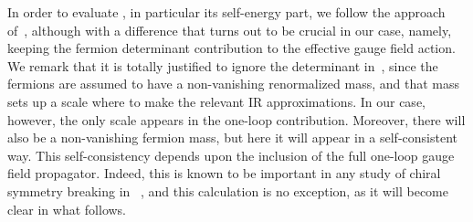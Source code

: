 \documentclass[12pt,a4paper]{article} \usepackage[latin1] {inputenc}
\begin{document}
In order to evaluate \coordHE{}, in particular its self-energy part, we
follow the approach of~\cite{Karanikas:1995zi}, although with a
difference that turns out to be crucial in our case, namely, keeping
the fermion determinant contribution to the effective gauge field
action. We remark that it is totally justified to ignore the
determinant in~\cite{Karanikas:1995zi}, since the fermions are assumed
to have a non-vanishing renormalized mass, and that mass sets up a
scale where to make the relevant IR approximations. In our case,
however, the only scale appears in the one-loop contribution.
Moreover, there will also be a non-vanishing fermion mass, but here it
will appear in a self-consistent way. This self-consistency depends
upon the inclusion of the full one-loop gauge field propagator.
Indeed, this is known to be important in any study of chiral symmetry
breaking in \coordHE{}~\cite{Pisarski:dj}, and this calculation is no
exception, as it will become clear in what follows.
\end{document}
